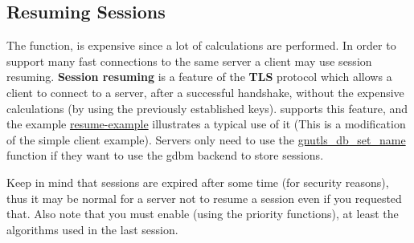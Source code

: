 \subsection{Resuming Sessions}
\par
The 
 function, is expensive since a lot of calculations are performed. In order to support many fast connections to
the same server a client may use session resuming. {\bf Session resuming} is a
feature of the {\bf TLS} protocol which allows a client to connect to a server,
after a successful handshake, without the expensive calculations (by using the previously
established keys). \gnutls{} supports this feature, and the
example \hyperref{resume client}{resume client (see Section }{)}{resume-example} illustrates a typical use of it (This is a modification of the simple client example).
Servers only need to use the
\hyperref{gnutls\_db\_set\_name()}{gnutls\_db\_set\_name() (see Section }{)}{gnutls_db_set_name} function if they want to use the gdbm
backend to store sessions. 
\par
Keep in mind that sessions are expired after some time (for security reasons), thus
it may be normal for a server not to resume a session even if you requested that.
Also note that you must enable (using the priority functions), at least the
algorithms used in the last session.

